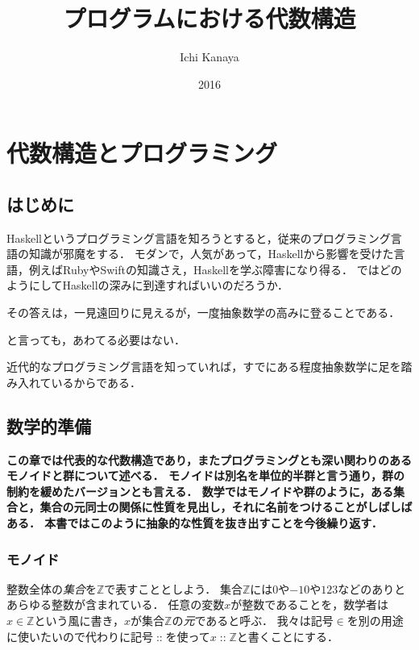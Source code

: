 \documentclass[twocolumn]{jsbook}
\title{プログラムにおける代数構造}
\author{Ichi Kanaya}
\date{2016}
\newcommand{\keyword}[1]{\emph{#1}}
\newenvironment{leader}{\begingroup\bf}{\endgroup}
\newcommand{\istypeof}{\mathop{::}}
\newcommand{\mathsetname}[1]{\mathbb{#1}}
\begin{document}
\maketitle
\tableofcontents

\part{代数構造とプログラミング}

\chapter{はじめに}

Haskellというプログラミング言語を知ろうとすると，従来のプログラミング言語の知識が邪魔をする．
モダンで，人気があって，Haskellから影響を受けた言語，例えばRubyやSwiftの知識さえ，Haskellを学ぶ障害になり得る．
ではどのようにしてHaskellの深みに到達すればいいのだろうか．

その答えは，一見遠回りに見えるが，一度抽象数学の高みに登ることである．

と言っても，あわてる必要はない．

近代的なプログラミング言語を知っていれば，すでにある程度抽象数学に足を踏み入れているからである．

\chapter{数学的準備}

\begin{leader}
この章では代表的な代数構造であり，またプログラミングとも深い関わりのあるモノイドと群について述べる．
モノイドは別名を単位的半群と言う通り，群の制約を緩めたバージョンとも言える．
数学ではモノイドや群のように，ある集合と，集合の元同士の関係に性質を見出し，それに名前をつけることがしばしばある．
本書ではこのように抽象的な性質を抜き出すことを今後繰り返す．
\end{leader}

\section{モノイド}

整数全体の\keyword{集合}を$\mathsetname{Z}$で表すこととしよう．
集合$\mathsetname{Z}$には$0$や$-10$や$123$などのありとあらゆる整数が含まれている．
任意の変数$x$が整数であることを，数学者は$x\in\mathsetname{Z}$という風に書き，$x$が集合$\mathsetname{Z}$の\keyword{元}であると呼ぶ．
我々は記号$\in$を別の用途に使いたいので代わりに記号$\istypeof$を使って$x\istypeof\mathsetname{Z}$と書くことにする．
\end{document}
